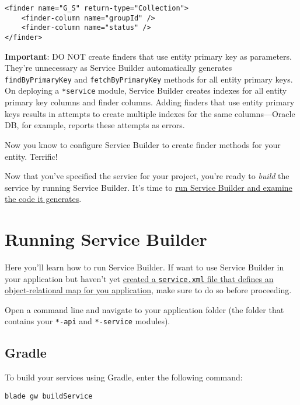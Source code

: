 \begin{verbatim}
<finder name="G_S" return-type="Collection">
    <finder-column name="groupId" />
    <finder-column name="status" />
</finder>
\end{verbatim}

\noindent\hrulefill

\textbf{Important}: DO NOT create finders that use entity primary key as
parameters. They're unnecessary as Service Builder automatically
generates \texttt{findByPrimaryKey} and \texttt{fetchByPrimaryKey}
methods for all entity primary keys. On deploying a \texttt{*service}
module, Service Builder creates indexes for all entity primary key
columns and finder columns. Adding finders that use entity primary keys
results in attempts to create multiple indexes for the same
columns---Oracle DB, for example, reports these attempts as errors.

\noindent\hrulefill

Now you know to configure Service Builder to create finder methods for
your entity. Terrific!

Now that you've specified the service for your project, you're ready to
\emph{build} the service by running Service Builder. It's time to
\href{/docs/7-2/appdev/-/knowledge_base/a/running-service-builder}{run
Service Builder and examine the code it generates}.

\chapter{Running Service Builder}\label{running-service-builder}

Here you'll learn how to run Service Builder. If want to use Service
Builder in your application but haven't yet
\href{/docs/7-2/appdev/-/knowledge_base/a/creating-the-service-xml-file}{created
a \texttt{service.xml} file that defines an object-relational map for
you application}, make sure to do so before proceeding.

Open a command line and navigate to your application folder (the folder
that contains your \texttt{*-api} and \texttt{*-service} modules).

\section{Gradle}\label{gradle}

To build your services using Gradle, enter the following command:

\begin{verbatim}
blade gw buildService
\end{verbatim}

